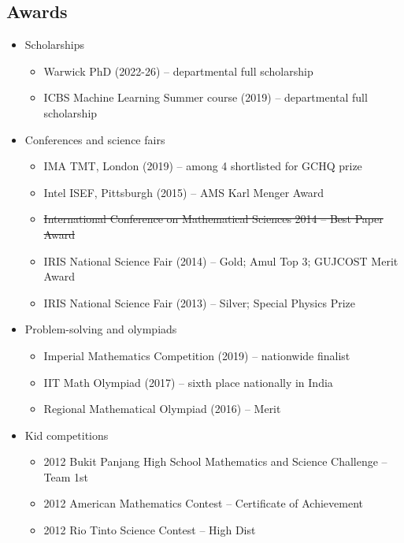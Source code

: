 \documentclass{article}
\newcommand{\disown}[1]{\sout{#1}}
\newcommand{\archive}{\color{lightgray}}
\begin{document}
{\archive

\subsection*{Awards}

\begin{itemize}
    \item Scholarships
          \begin{itemize}
              \item Warwick PhD (2022-26) -- departmental full scholarship
              \item ICBS Machine Learning Summer course (2019) -- departmental full scholarship
          \end{itemize}
    \item Conferences and science fairs
          \begin{itemize}
              \item IMA TMT, London (2019) -- among 4 shortlisted for GCHQ prize
              \item Intel ISEF, Pittsburgh (2015) -- AMS Karl Menger Award
              \item \disown{International Conference on Mathematical Sciences 2014 -- Best Paper Award}
              \item IRIS National Science Fair (2014) -- Gold; Amul Top 3; GUJCOST Merit Award
              \item IRIS National Science Fair (2013) -- Silver; Special Physics Prize
          \end{itemize}
    \item Problem-solving and olympiads
          \begin{itemize}
              \item Imperial Mathematics Competition (2019) -- nationwide finalist
              \item IIT Math Olympiad (2017) -- sixth place nationally in India
              \item Regional Mathematical Olympiad (2016) -- Merit
          \end{itemize}
    \item Kid competitions
          \begin{itemize}
              \item 2012 Bukit Panjang High School Mathematics and Science Challenge -- Team 1st
              \item 2012 American Mathematics Contest -- Certificate of Achievement
              \item 2012 Rio Tinto Science Contest -- High Dist

\end{itemize}
\end{itemize}}
\end{document}
